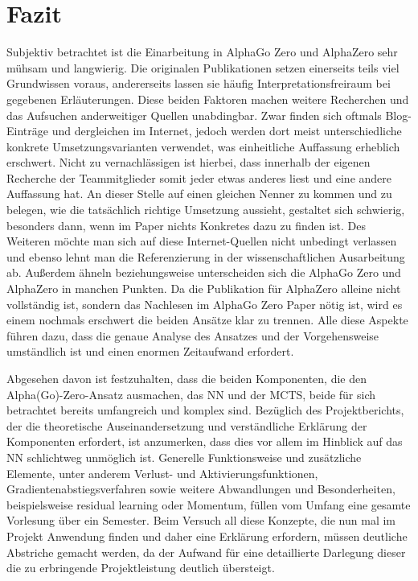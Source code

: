 \documentclass[12pt,a4paper]{article}
\begin{document}
\newpage
\section{Fazit}

Subjektiv betrachtet ist die Einarbeitung in AlphaGo Zero und AlphaZero sehr mühsam und langwierig. Die originalen Publikationen setzen einerseits teils viel Grundwissen voraus, andererseits lassen sie häufig Interpretationsfreiraum bei gegebenen Erläuterungen. Diese beiden Faktoren machen weitere Recherchen und das Aufsuchen anderweitiger Quellen unabdingbar. Zwar finden sich oftmals Blog-Einträge und dergleichen im Internet, jedoch werden dort meist unterschiedliche konkrete Umsetzungsvarianten verwendet, was einheitliche Auffassung erheblich erschwert. Nicht zu vernachlässigen ist hierbei, dass innerhalb der eigenen Recherche der Teammitglieder somit jeder etwas anderes liest und eine andere Auffassung hat. An dieser Stelle auf einen gleichen Nenner zu kommen und zu belegen, wie die tatsächlich richtige Umsetzung aussieht, gestaltet sich schwierig, besonders dann, wenn im Paper nichts Konkretes dazu zu finden ist. Des Weiteren möchte man sich auf diese Internet-Quellen nicht unbedingt verlassen und ebenso lehnt man die Referenzierung in der wissenschaftlichen Ausarbeitung ab. Außerdem ähneln beziehungsweise unterscheiden sich die AlphaGo Zero und AlphaZero in manchen Punkten. Da die Publikation für AlphaZero alleine nicht vollständig ist, sondern das Nachlesen im AlphaGo Zero Paper nötig ist, wird es einem nochmals erschwert die beiden Ansätze klar zu trennen. Alle diese Aspekte führen dazu, dass die genaue Analyse des Ansatzes und der Vorgehensweise umständlich ist und einen enormen Zeitaufwand erfordert. 

Abgesehen davon ist festzuhalten, dass die beiden Komponenten, die den Alpha(Go)-Zero-Ansatz ausmachen, das NN und der MCTS, beide für sich betrachtet bereits umfangreich und komplex sind. Bezüglich des Projektberichts, der die theoretische Auseinandersetzung und verständliche Erklärung der Komponenten erfordert, ist anzumerken, dass dies vor allem im Hinblick auf das NN schlichtweg unmöglich ist. Generelle Funktionsweise und zusätzliche Elemente, unter anderem Verlust- und Aktivierungsfunktionen, Gradientenabstiegsverfahren sowie weitere Abwandlungen und Besonderheiten, beispielsweise residual learning oder Momentum, füllen vom Umfang eine gesamte Vorlesung über ein Semester. Beim Versuch all diese Konzepte, die nun mal im Projekt Anwendung finden und daher eine Erklärung erfordern, müssen deutliche Abstriche gemacht werden, da der Aufwand für eine detaillierte Darlegung dieser die zu erbringende Projektleistung deutlich übersteigt.
\end{document}
